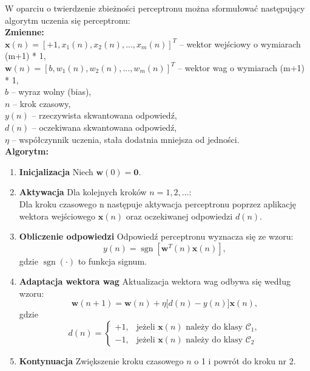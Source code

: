 \begin{tcolorbox}[title=Algorytm zbieżności perceptronu,colback=blue!5!white,colframe=blue!75!black,breakable]
W oparciu o twierdzenie zbieżności perceptronu można sformułować następujący algorytm uczenia się perceptronu: \cite{haykin2009neural}\\

\textbf{Zmienne:}\\
$\mathbf{x}(n) = [+1,x_1(n),x_2(n),...,x_m(n)]^T$ -- wektor wejściowy o wymiarach (m+1) * 1, \\
$\mathbf{w}(n) = [b,w_1(n),w_2(n),...,w_m(n)]^T$ -- wektor wag o wymiarach (m+1) * 1, \\
$b$ -- wyraz wolny (bias), \\
$n$ -- krok czasowy, \\
$y(n)$ -- rzeczywista skwantowana odpowiedź, \\
$d(n)$ -- oczekiwana skwantowana odpowiedź, \\
$\eta$ -- współczynnik uczenia, stała dodatnia mniejsza od jedności. \\

\textbf{Algorytm:}

\begin{enumerate}
    \item \textbf{Inicjalizacja}  
    Niech $\mathbf{w}(0) = \mathbf{0}$.

    \item \textbf{Aktywacja}  
    Dla kolejnych kroków $n = 1,2,...$:\\
    Dla kroku czasowego n następuje aktywacja perceptronu poprzez aplikację wektora wejściowego $\mathbf{x}(n)$ oraz oczekiwanej odpowiedzi $d(n)$.

    \item \textbf{Obliczenie odpowiedzi}  
    Odpowiedź perceptronu wyznacza się ze wzoru:
    \[
    y(n) = \operatorname{sgn}\!\left[\mathbf{w}^T(n)\mathbf{x}(n)\right],
    \]
    gdzie $\operatorname{sgn}(\cdot)$ to funkcja signum.

    \item \textbf{Adaptacja wektora wag}  
    Aktualizacja wektora wag odbywa się według wzoru:
    \[
    \mathbf{w}(n+1) = \mathbf{w}(n) + \eta\big[d(n) - y(n)\big]\mathbf{x}(n),
    \]
    gdzie
    \[
    d(n) =
    \begin{cases}
        +1, & \text{jeżeli } \mathbf{x}(n) \text{ należy do klasy } \mathcal{C}_1, \\
        -1, & \text{jeżeli } \mathbf{x}(n) \text{ należy do klasy } \mathcal{C}_2
    \end{cases}
    \]

    \item \textbf{Kontynuacja}  
    Zwiększenie kroku czasowego $n$ o 1 i powrót do kroku nr 2.
\end{enumerate}

\end{tcolorbox}

